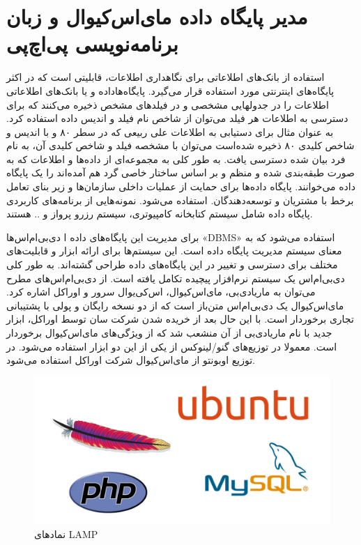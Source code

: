 \section{مدیر پایگاه‌ داده مای‌اس‌کیو‌ال و زبان برنامه‌نویسی پی‌اچ‌پی}
\label{2}
 
استفاده از بانک‌های اطلاعاتی برای نگاهداری اطلاعات، قابلیتی است که در اکثر پایگاه‌های اینترنتی مورد استفاده قرار می‌گیرد. پایگاه‌ها‌داده و یا بانک‌های اطلاعاتی اطلاعات را در جدولهایی مشخصی و در فیلدهای مشخص ذخیره می‌کنند که برای دسترسی به اطلاعات هر فیلد می‌توان از شاخص نام فیلد و اندیس داده استفاده کرد. به عنوان مثال برای دستیابی به اطلاعات علی ربیعی که در سطر ۸۰ و با اندیس و شاخص کلیدی ۸۰ ذخیره شده‌است می‌توان با مشخصه فیلد و شاخص کلیدی آن، به نام فرد بیان شده دسترسی یافت. به طور کلی به مجموعه‌ای از داده‌ها و اطلاعات که به صورت طبقه‌بندی شده و منظم و بر اساس ساختار خاصی گرد هم آمده‌اند را یک پایگاه داده می‌خوانند. پایگاه داده‌ها برای حمایت از عملیات داخلی سازمان‌ها و زیر بنای تعامل برخط  با مشتریان و توسعه‌دهندگان. استفاده می‌شود. نمونه‌هایی از برنامه‌های کاربردی پایگاه داده شامل سیستم کتابخانه کامپیوتری، سیستم رزرو پرواز و .. هستند.

برای مدیریت این پایگاه‌های داده ا دی‌بی‌ام‌اس‌ها «DBMS» استفاده می‌شود که به معنای سیستم مدیریت پایگاه داده است. این سیستم‌ها برای ارائه ابزار و قابلیت‌های مختلف برای دسترسی و تغییر در این پایگاه‌های داده طراحی گشته‌اند. به طور کلی دی‌بی‌ام‌اس یک سیستم نرم‌افزار پیچیده تکامل یافته است. از دی‌بی‌ام‌اس‌های مطرح می‌توان به ماریا‌دی‌بی، مای‌اس‌کیو‌ال، اس‌کی‌یو‌ال سرور و اوراکل اشاره کرد. مای‌اس‌کیو‌ال یک دی‌بی‌ام‌اس متن‌باز است که از دو نسخه رایگان و پولی با پشتیبانی تجاری برخوردار است. با این حال بعد از خریده شدن شرکت سان توسط اوراکل، ابزار جدید با نام ماریا‌دی‌بی از آن منشعب شد که از ویژگی‌های مای‌اس‌کیو‌ال برخوردار است. معمولا در توزیع‌های گنو/لینوکس از یکی از این دو ابزار استفاده می‌شود. در توزیع اوبونتو از مای‌اس‌کیو‌ال شرکت اوراکل استفاده می‌شود.

\begin{figure}
\includegraphics[width=.9\textwidth ,height=.50\textwidth]{Pic/InformationHidingHierarch}
\caption{ نمادهای LAMP}
\label{LampLogo}
\end{figure}


